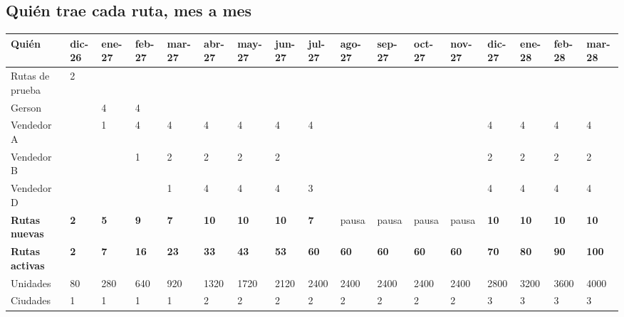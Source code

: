 \documentclass[10.5pt,a4paper]{article}
\begin{document}
\begin{landscape}
\subsection{Quién trae cada ruta, mes a mes}
{\scriptsize\setlength{\tabcolsep}{3pt}
\begin{tabular}{@{}l*{16}{Q}@{}}
\toprule
Quién & dic-26 & ene-27 & feb-27 & mar-27 & abr-27 & may-27 & jun-27 & jul-27 & ago-27 & sep-27 & oct-27 & nov-27 & dic-27 & ene-28 & feb-28 & mar-28 \\
\midrule
Rutas de prueba & 2 &  &  &  &  &  &  &  &  &  &  &  &  &  &  &  \\
Gerson &  & 4 & 4 &  &  &  &  &  &  &  &  &  &  &  &  &  \\
Vendedor A &  & 1 & 4 & 4 & 4 & 4 & 4 & 4 &  &  &  &  & 4 & 4 & 4 & 4 \\
Vendedor B &  &  & 1 & 2 & 2 & 2 & 2 &  &  &  &  &  & 2 & 2 & 2 & 2 \\
Vendedor D &  &  &  & 1 & 4 & 4 & 4 & 3 &  &  &  &  & 4 & 4 & 4 & 4 \\
\textbf{Rutas nuevas} & \textbf{2} & \textbf{5} & \textbf{9} & \textbf{7} & \textbf{10} & \textbf{10} & \textbf{10} & \textbf{7} & {\color{ambar}pausa} & {\color{ambar}pausa} & {\color{ambar}pausa} & {\color{ambar}pausa} & \textbf{10} & \textbf{10} & \textbf{10} & \textbf{10} \\
\textbf{Rutas activas} & \textbf{2} & \textbf{7} & \textbf{16} & \textbf{23} & \textbf{33} & \textbf{43} & \textbf{53} & \textbf{60} & \textbf{60} & \textbf{60} & \textbf{60} & \textbf{60} & \textbf{70} & \textbf{80} & \textbf{90} & \textbf{100} \\
{\color{tenue}Unidades} & {\color{tenue}80} & {\color{tenue}280} & {\color{tenue}640} & {\color{tenue}920} & {\color{tenue}1320} & {\color{tenue}1720} & {\color{tenue}2120} & {\color{tenue}2400} & {\color{tenue}2400} & {\color{tenue}2400} & {\color{tenue}2400} & {\color{tenue}2400} & {\color{tenue}2800} & {\color{tenue}3200} & {\color{tenue}3600} & {\color{tenue}4000} \\
{\color{tenue}Ciudades} & {\color{tenue}1} & {\color{tenue}1} & {\color{tenue}1} & {\color{tenue}1} & {\color{tenue}2} & {\color{tenue}2} & {\color{tenue}2} & {\color{tenue}2} & {\color{tenue}2} & {\color{tenue}2} & {\color{tenue}2} & {\color{tenue}2} & {\color{tenue}3} & {\color{tenue}3} & {\color{tenue}3} & {\color{tenue}3} \\
\bottomrule
\end{tabular}}


\end{landscape}
\end{document}
